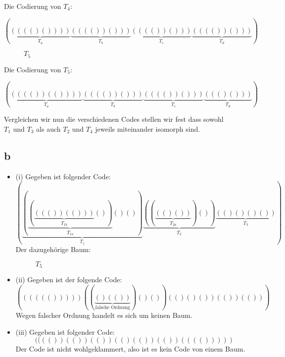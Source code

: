 \documentclass[12pt]{article}
\begin{document}
Die Codierung von $T_4$:

$$
( \underbrace{ (((()())))}_{T_a}  \underbrace{ (((()) ())) }_{T_b}   \underbrace{ (((()) ())) }_{T_c} \underbrace{ (( (()) () )) }_{ T_d  }    )
$$



\begin{figure}[h]
	\centering
	\scalebox{.5}{}
	\caption{$T_5$} 
	\label{img:baum5}
\end{figure}


Die Codierung von $T_5$:



$$
( \underbrace{ (((()) (())))}_{T_a}  \underbrace{ (( (()) () )) }_{T_b}   \underbrace{ (( (()) () )) }_{T_c} \underbrace{  ((()()))  }_{ T_d  }    )
$$

Vergleichen wir nun die verschiedenen Codes stellen wir fest dass sowohl $T_1 \text{ und } T_3$ als auch
$T_2 \text{ und } T_4$ jeweils miteinander isomorph sind.

\newpage

\subsection*{b}

\begin{itemize}
\item (i) Gegeben ist folgender Code:
$$
( \underbrace{(\underbrace{(   \underbrace{(( () )  ( ()  ))}_{T_{1b}} () )}_{T_{1a}}    ()())}_{T_1}     \underbrace{(( \underbrace{(()())}_{T_{2a}}  )())}_{T_2}  \underbrace{(()()()())}_{T_3})
$$
Der dazugehörige Baum:

\begin{figure}[h]
	\centering
	\scalebox{.5}{}
	\caption{$T_5$} 
	\label{img:baum5}
\end{figure}

\item (ii) Gegeben ist der folgende Code:
$$
(((((())))) ((  \underbrace{() (())}_{\text{falsche Ordnung}}  ) ()() )  (()()())  (()) (()))
$$
Wegen falscher Ordnung handelt es sich um keinen Baum.

\item (iii) Gegeben ist folgender Code:
$$
(((()) (())  (())  (  ()  (())  (())  (((())))  )
$$
Der Code ist nicht wohlgeklammert, also ist es kein Code von einem Baum.
\end{itemize}

\newpage
\end{document}
